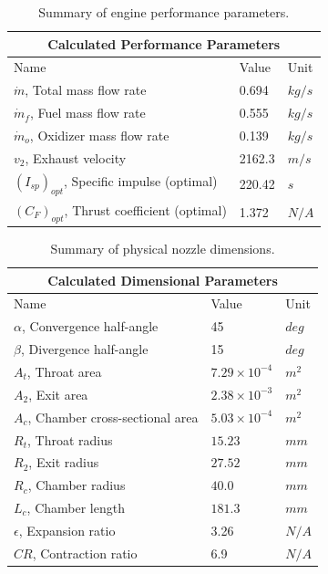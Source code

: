\documentclass[9pt]{article} %
\numberwithin{equation}{section} %
\begin{document}
\begin{table}[!htb]
\centering
\begin{tabular}{ |p{6cm}||p{2cm}|p{1cm}| }
\hline
\multicolumn{3}{|c|}{Calculated Performance Parameters} \\
\hline
Name & Value & Unit \\ 
\hline
$\dot{m}$, Total mass flow rate  &  0.694  &  $kg/s$  \\
$\dot{m}_{f}$, Fuel mass flow rate &  0.555  &  $kg/s$  \\
$\dot{m}_{o}$, Oxidizer mass flow rate &  0.139  &  $kg/s$  \\
$v_{2}$, Exhaust velocity & 2162.3 & $m/s$ \\
$(I_{sp})_{opt}$, Specific impulse (optimal) & 220.42 & $s$ \\
$(C_{F})_{opt}$, Thrust coefficient (optimal) & 1.372 & $N/A$ \\
\hline
\end{tabular}
\caption{Summary of engine performance parameters.}
\label{table:calculated_parameters}
\end{table}

\begin{table}[!htb]
\centering
\begin{tabular}{ |p{6cm}||p{2cm}|p{1cm}| }
\hline
\multicolumn{3}{|c|}{Calculated Dimensional Parameters} \\
\hline
Name & Value & Unit \\ 
\hline
$\alpha$, Convergence half-angle &  45  &  $deg$ \\
$\beta$, Divergence half-angle &  15  &  $deg$  \\
$A_{t}$, Throat area  & $7.29 \times 10^{-4}$ & $m^{2}$ \\
$A_{2}$, Exit area & $2.38 \times 10^{-3}$ & $m^{2}$ \\
$A_{c}$, Chamber cross-sectional area & $5.03 \times 10^{-4}$ & $m^{2}$ \\
$R_{t}$, Throat radius & $15.23$ & $mm$ \\
$R_{2}$, Exit radius & $27.52$ & $mm$ \\
$R_{c}$, Chamber radius & $40.0$ & $mm$ \\
$L_{c}$, Chamber length & $181.3$ & $mm$ \\
$\epsilon$, Expansion ratio  &  3.26  &  $N/A$  \\
$CR$, Contraction ratio  &  6.9  &  $N/A$  \\
\hline
\end{tabular}
\caption{Summary of physical nozzle dimensions.}
\label{table:calculated_dimensions}
\end{table}
\end{document}

